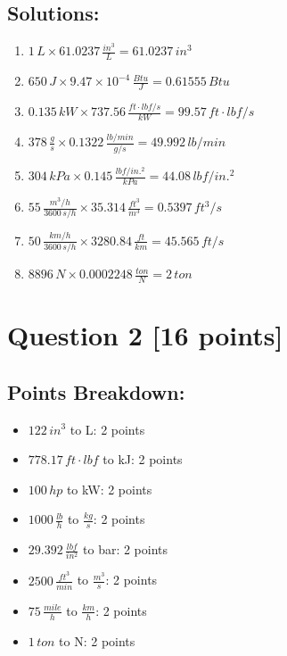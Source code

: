 \documentclass[12pt]{article}
\begin{document}
\subsection*{Solutions:}
\begin{enumerate}
    \item \(1\, L \times 61.0237\, \frac{in^3}{L} = 61.0237\, in^3\) 
    \item \(650\, J \times 9.47 \times 10^{-4}\, \frac{Btu}{J} = 0.61555\, Btu\)
    \item \(0.135\, kW \times 737.56\, \frac{ft \cdot lbf/s}{kW} = 99.57\, ft \cdot lbf/s\)
    \item \(378\, \frac{g}{s} \times 0.1322\, \frac{lb/min}{g/s} = 49.992\, lb/min\)
    \item \(304\, kPa \times 0.145\, \frac{lbf/in.^2}{kPa} = 44.08\, lbf/in.^2\)
    \item \(55\, \frac{m^3/h}{3600\, s/h} \times 35.314\, \frac{ft^3}{m^3} = 0.5397\, ft^3/s\)
    \item \(50\, \frac{km/h}{3600\, s/h} \times 3280.84\, \frac{ft}{km} = 45.565\, ft/s\)
    \item \(8896\, N \times 0.0002248\, \frac{ton}{N} = 2\, ton\)
\end{enumerate}


\newpage
\section*{Question 2 [16 points]}
\subsection*{Points Breakdown:}
\begin{itemize}
    \item \(122\, in^3\) to L: 2 points
    \item \(778.17\, ft \cdot lbf\) to kJ: 2 points
    \item \(100\, hp\) to kW: 2 points
    \item \(1000\, \frac{lb}{h}\) to \( \frac{kg}{s}\): 2 points
    \item \(29.392\, \frac{lbf}{in^2}\) to bar: 2 points
    \item \(2500\, \frac{ft^3}{min}\) to \( \frac{m^3}{s}\): 2 points
    \item \(75\, \frac{mile}{h}\) to \( \frac{km}{h}\): 2 points
    \item \(1\, ton\) to N: 2 points
\end{itemize}
\end{document}
